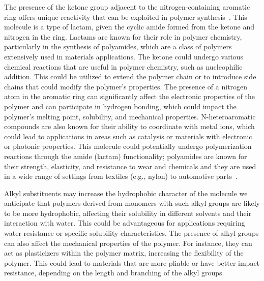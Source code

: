 The presence of the ketone group adjacent to the nitrogen-containing aromatic ring offers unique reactivity that can be exploited in polymer synthesis~\cite{McQuarrieSimonPhysicalChemistry,CareySundbergAdvancedOrganicChemistry,Varghese2022BeyondApplications,Varghese2022BeyondApplications}. This molecule is a type of lactam, given the cyclic amide formed from the ketone and nitrogen in the ring. Lactams are known for their role in polymer chemistry, particularly in the synthesis of polyamides, which are a class of polymers extensively used in materials applications. The ketone could undergo various chemical reactions that are useful in polymer chemistry, such as nucleophilic addition. This could be utilized to extend the polymer chain or to introduce side chains that could modify the polymer's properties. The presence of a nitrogen atom in the aromatic ring can significantly affect the electronic properties of the polymer and can participate in hydrogen bonding, which could impact the polymer's melting point, solubility, and mechanical properties. N-heteroaromatic compounds are also known for their ability to coordinate with metal ions, which could lead to applications in areas such as catalysis or materials with electronic or photonic properties. This molecule could potentially undergo polymerization reactions through the amide (lactam) functionality; polyamides are known for their strength, elasticity, and resistance to wear and chemicals and they are used in a wide range of settings from textiles (e.g., nylon) to automotive parts~\cite{Varghese2022BeyondApplications,Varghese2022BeyondApplications}.

Alkyl substituents may increase the hydrophobic character of the molecule we anticipate that polymers derived from monomers with such alkyl groups are likely to be more hydrophobic, affecting their solubility in different solvents and their interaction with water. This could be advantageous for applications requiring water resistance or specific solubility characteristics. The presence of alkyl groups can also affect the mechanical properties of the polymer. For instance, they can act as plasticizers within the polymer matrix, increasing the flexibility of the polymer. This could lead to materials that are more pliable or have better impact resistance, depending on the length and branching of the alkyl groups.


